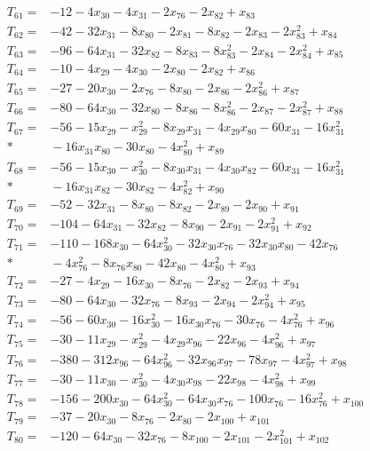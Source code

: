 \begin{align*}
T_{61}={}&-12-4x_{30}-4x_{31}-2x_{76}-2x_{82}+x_{83}\\[3pt]
T_{62}={}&-42-32x_{31}-8x_{80}-2x_{81}-8x_{82}-2x_{83}-2x_{83}^{2}+x_{84}\\[3pt]
T_{63}={}&-96-64x_{31}-32x_{82}-8x_{83}-8x_{83}^{2}-2x_{84}-2x_{84}^{2}+x_{85}\\[3pt]
T_{64}={}&-10-4x_{29}-4x_{30}-2x_{80}-2x_{82}+x_{86}\\[3pt]
T_{65}={}&-27-20x_{30}-2x_{76}-8x_{80}-2x_{86}-2x_{86}^{2}+x_{87}\\[3pt]
T_{66}={}&-80-64x_{30}-32x_{80}-8x_{86}-8x_{86}^{2}-2x_{87}-2x_{87}^{2}+x_{88}\\[3pt]
T_{67}={}&-56-15x_{29}-x_{29}^{2}-8x_{29}x_{31}-4x_{29}x_{80}-60x_{31}-16x_{31}^{2}\\*
&{}-16x_{31}x_{80}-30x_{80}-4x_{80}^{2}+x_{89}\\[3pt]
T_{68}={}&-56-15x_{30}-x_{30}^{2}-8x_{30}x_{31}-4x_{30}x_{82}-60x_{31}-16x_{31}^{2}\\*
&{}-16x_{31}x_{82}-30x_{82}-4x_{82}^{2}+x_{90}\\[3pt]
T_{69}={}&-52-32x_{31}-8x_{80}-8x_{82}-2x_{89}-2x_{90}+x_{91}\\[3pt]
T_{70}={}&-104-64x_{31}-32x_{82}-8x_{90}-2x_{91}-2x_{91}^{2}+x_{92}\\[3pt]
T_{71}={}&-110-168x_{30}-64x_{30}^{2}-32x_{30}x_{76}-32x_{30}x_{80}-42x_{76}\\*
&{}-4x_{76}^{2}-8x_{76}x_{80}-42x_{80}-4x_{80}^{2}+x_{93}\\[3pt]
T_{72}={}&-27-4x_{29}-16x_{30}-8x_{76}-2x_{82}-2x_{93}+x_{94}\\[3pt]
T_{73}={}&-80-64x_{30}-32x_{76}-8x_{93}-2x_{94}-2x_{94}^{2}+x_{95}\\[3pt]
T_{74}={}&-56-60x_{30}-16x_{30}^{2}-16x_{30}x_{76}-30x_{76}-4x_{76}^{2}+x_{96}\\[3pt]
T_{75}={}&-30-11x_{29}-x_{29}^{2}-4x_{29}x_{96}-22x_{96}-4x_{96}^{2}+x_{97}\\[3pt]
T_{76}={}&-380-312x_{96}-64x_{96}^{2}-32x_{96}x_{97}-78x_{97}-4x_{97}^{2}+x_{98}\\[3pt]
T_{77}={}&-30-11x_{30}-x_{30}^{2}-4x_{30}x_{98}-22x_{98}-4x_{98}^{2}+x_{99}\\[3pt]
T_{78}={}&-156-200x_{30}-64x_{30}^{2}-64x_{30}x_{76}-100x_{76}-16x_{76}^{2}+x_{100}\\[3pt]
T_{79}={}&-37-20x_{30}-8x_{76}-2x_{80}-2x_{100}+x_{101}\\[3pt]
T_{80}={}&-120-64x_{30}-32x_{76}-8x_{100}-2x_{101}-2x_{101}^{2}+x_{102}\\[3pt]

\end{align*}
